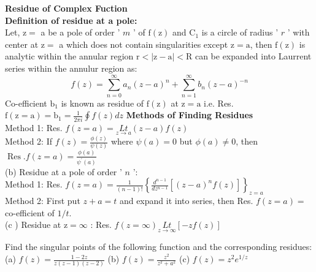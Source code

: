 \textbf{Residue of Complex Fuction}\\
\textbf{Definition of residue at a pole:}\\
Let, $\mathrm{z}=$ a be a pole of order ' $m$ ' of $\mathrm{f}(\mathrm{z})$ and $\mathrm{C}_{1}$ is a circle of radius ' $r$ ' with center at $\mathrm{z}=$ a which does not contain singularities except $\mathrm{z}=\mathrm{a}$, then $\mathrm{f}(\mathrm{z})$ is analytic within the annular region $\mathrm{r}<|\mathrm{z}-\mathrm{a}|<\mathrm{R}$ can be expanded into Laurrent series within the annulur region as:
$$f(z)=\sum_{n=0}^{\infty} a_{n}(z-a)^{n}+\sum_{n=1}^{\infty} b_{n}(z-a)^{-n}$$
Co-efficient $\mathrm{b}_{1}$ is known as residue of $\mathrm{f}(\mathrm{z})$ at $\mathrm{z}=\mathrm{a}$ i.e. Res. $\mathrm{f}(\mathrm{z}=\mathrm{a})=\mathrm{b}_{1}=\frac{1}{2 \pi i} \oint f(z) d z$
\textbf{Methods of Finding Residues}\\
Method 1: Res. $f(z=a)=\underset{z \rightarrow a}{L t}(z-a) f(z)$\\
Method 2: If $f(z)=\frac{\phi(z)}{\psi(z)}$ where $\psi(a)=0$ but $\phi(a) \neq 0$, then $\operatorname{Res} . f(z=a)=\frac{\phi(a)}{\psi^{\prime}(a)}$\\
(b) Residue at a pole of order ' $n$ ':\\
Method 1: Res. $f(z=a)=\frac{1}{(n-1) !}\left\{\frac{d^{n-1}}{d z^{n-1}}\left[(z-a)^{n} f(z)\right]\right\}_{z=a}$\\
Method 2: First put $z+a=t$ and expand it into series, then Res. $f(z=a)=$ co-efficient of $1 / t$.\\
(c ) Residue at $\mathrm{z}=\infty$ : Res. $f(z=\infty) \underset{z \rightarrow \infty}{L t}[-z f(z)]$
\begin{exercise}
	 Find the singular points of the following function and the corresponding residues:\\
	(a) $f(z)=\frac{1-2 z}{z(z-1)(z-2)}$\quad
	(b) $f(z)=\frac{z^{2}}{z^{2}+a^{2}}$\quad
	(c) $f(z)=z^{2} e^{1 / z}$
\end{exercise}
